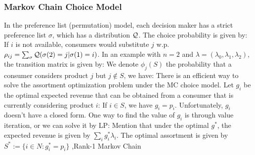 \documentclass[12pt]{report}
\begin{document}
\subsubsection{Markov Chain Choice Model}
In the preference list (permutation) model, each decision maker has a strict preference list $\sigma$, which has a distribution $\mathcal{Q}$. The choice probability is given by:
If $i$ is not available, consumers would substitute $j$ w.p. $\rho_{ij}=\sum_\sigma \mathcal{Q}(\sigma(2)=j | \sigma(1)=i)$. In an example with $n=2$ and
$\lambda = (\lambda_0, \lambda_1, \lambda_2)$, the transition matrix is given by:
We denote $\phi_j(S)$ the probability that a consumer considers product $j$ but $j\notin S$, we have:
There is an efficient way to solve the assortment optimization problem under the MC choice model. Let $g_i$ be the optimal expected revenue that can be obtained from a consumer that is currently considering product $i$:
If $i\in S$, we have $g_i=p_i$. Unfortunately, $g_i$ doesn't have a closed form. One way to find the value of $g_i$ is through value iteration, or we can solve it by LP:
Mention that under the optimal $g^*$, the expected revenue is given by $\sum_i g_i^* \lambda_i$. The optimal assortment is given by $S^*:=\{i\in N:g_i^*=p_i\}$
\sep{Rank-1 Markov Chain}
\end{document}
